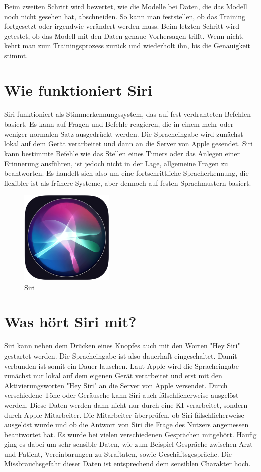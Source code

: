 \documentclass{article}
\begin{document}
Beim zweiten Schritt wird bewertet, wie die Modelle bei Daten, die das Modell noch nicht gesehen hat, abschneiden. So kann man feststellen, ob das Training fortgesetzt oder irgendwie verändert werden muss. 
Beim letzten Schritt wird getestet, ob das Modell mit den Daten genaue Vorhersagen trifft. Wenn nicht, kehrt man zum Trainingsprozess zurück und wiederholt ihn, bis die Genauigkeit stimmt.


\section{Wie funktioniert Siri}
Siri funktioniert als Stimmerkennungssystem, das auf fest verdrahteten Befehlen basiert. Es kann auf Fragen und Befehle reagieren, die in einem mehr oder weniger normalen Satz ausgedrückt werden. Die Spracheingabe wird zunächst lokal auf dem Gerät verarbeitet und dann an die Server von Apple gesendet. Siri kann bestimmte Befehle wie das Stellen eines Timers oder das Anlegen einer Erinnerung ausführen, ist jedoch nicht in der Lage, allgemeine Fragen zu beantworten. Es handelt sich also um eine fortschrittliche Spracherkennung, die flexibler ist als frühere Systeme, aber dennoch auf festen Sprachmustern basiert.


\begin{figure}[ht]
    \centering
    \includegraphics[width=0.4\textwidth]{siri.jpg}
    \caption{Siri}
    \label{fig:siri}
    \end{figure}

\section{Was hört Siri mit?}
Siri kann neben dem Drücken eines Knopfes auch mit den Worten "Hey Siri" gestartet werden. Die Spracheingabe ist also dauerhaft eingeschaltet. Damit verbunden ist somit ein Dauer lauschen. Laut Apple wird die Spracheingabe zunächst nur lokal auf dem eigenen Gerät verarbeitet und erst mit den Aktivierungsworten "Hey Siri" an die Server von Apple versendet. Durch verschiedene Töne oder Geräusche kann Siri auch fälschlicherweise ausgelöst werden. Diese Daten werden dann nicht nur durch eine KI verarbeitet, sondern durch Apple Mitarbeiter. Die Mitarbeiter überprüfen, ob Siri fälschlicherweise ausgelöst wurde und ob die Antwort von Siri die Frage des Nutzers angemessen beantwortet hat.
Es wurde bei vielen verschiedenen Gesprächen mitgehört. Häufig ging es dabei um sehr sensible Daten, wie zum Beispiel Gespräche zwischen Arzt und Patient, Vereinbarungen zu Straftaten, sowie Geschäftsgespräche. Die Missbrauchsgefahr dieser Daten ist entsprechend dem sensiblen Charakter hoch. 
\end{document}
